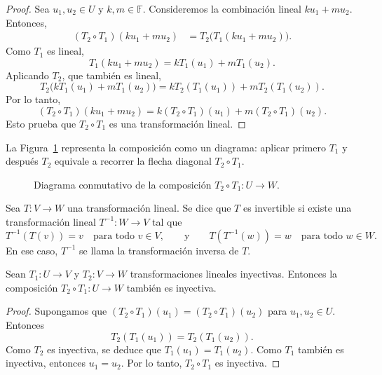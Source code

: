 \begin{proof}
Sea $u_1, u_2 \in U$ y $k, m \in \mathbb{F}$. Consideremos la combinación lineal $k u_1 + m u_2$. Entonces,
\begin{align*}
(T_2 \circ T_1)(k u_1 + m u_2) &= T_2\big(T_1(k u_1 + m u_2)\big).
\end{align*}
Como $T_1$ es lineal,
\[
T_1(k u_1 + m u_2) = k T_1(u_1) + m T_1(u_2).
\]
Aplicando $T_2$, que también es lineal,
\[
T_2\big(k T_1(u_1) + m T_1(u_2)\big) = k T_2(T_1(u_1)) + m T_2(T_1(u_2)).
\]
Por lo tanto,
\[
(T_2 \circ T_1)(k u_1 + m u_2) = k (T_2 \circ T_1)(u_1) + m (T_2 \circ T_1)(u_2).
\]
Esto prueba que $T_2 \circ T_1$ es una transformación lineal.
\end{proof}

La Figura~\ref{fig:composicion_diagrama} representa la composición como un diagrama: aplicar primero $T_1$ y después $T_2$ equivale a recorrer la flecha diagonal $T_2 \circ T_1$.

\begin{figure}[!htbp]\centering
{}
\caption{Diagrama conmutativo de la composición $T_2 \circ T_1: U \to W$.}\label{fig:composicion_diagrama}
\end{figure}


\begin{definition}
Sea $T: V \to W$ una transformación lineal. Se dice que $T$ es invertible si existe una transformación lineal $T^{-1}: W \to V$ tal que
\[
T^{-1}(T(v)) = v \quad \text{para todo } v \in V, \qquad \text{y} \qquad T(T^{-1}(w)) = w \quad \text{para todo } w \in W.
\]
En ese caso, $T^{-1}$ se llama la transformación inversa de $T$.
\end{definition}

\begin{theorem}
Sean $T_1: U \to V$ y $T_2: V \to W$ transformaciones lineales inyectivas. Entonces la composición $T_2 \circ T_1: U \to W$ también es inyectiva.
\begin{proof}
Supongamos que $(T_2 \circ T_1)(u_1) = (T_2 \circ T_1)(u_2)$ para $u_1, u_2 \in U$. Entonces
\[
T_2(T_1(u_1)) = T_2(T_1(u_2)).
\]
Como $T_2$ es inyectiva, se deduce que $T_1(u_1) = T_1(u_2)$. Como $T_1$ también es inyectiva, entonces $u_1 = u_2$. Por lo tanto, $T_2 \circ T_1$ es inyectiva.
\end{proof}
\end{theorem}

